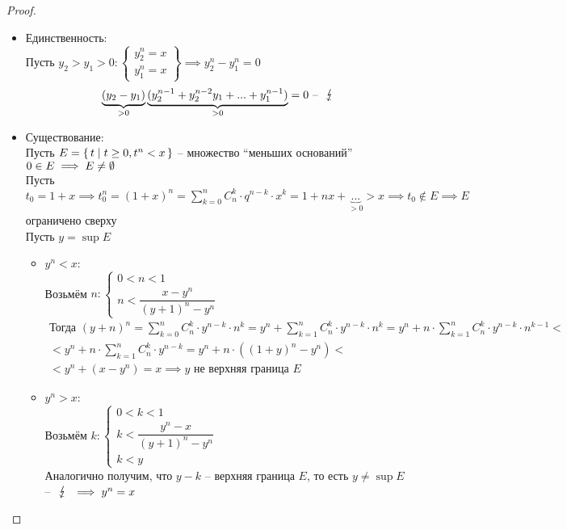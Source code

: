 \begin{proof}
	\hfill
	\begin{itemize}
		\item Единственность: \\
		Пусть $y_2 > y_1 > 0 : \begin{Bmatrix} y_2^n = x \\ y_1^n = x \end{Bmatrix} \implies y_2^n - y_1^n = 0 $
		$$ \underbrace{(y_2 - y_1)}_{>0} \underbrace{(y_2^{n-1} + y_2^{n-2}y_1 + ... + y_1^{n-1})}_{>0} = 0 \text{ -- } \contra $$
		\item Существование: \\
		Пусть $E = \set{t | t \ge 0, t^n < x}$ -- множество ``меньших оснований'' \\
		$0 \in E \implies E \ne \emptyset $ \\
		Пусть $t_0 = 1 + x \implies t_0^n = (1+x)^n = \sum_{k=0}^n C_n^k \cdot q^{n-k} \cdot x^k = 1 + nx + \underbrace{...}_{>0} > x \implies t_0 \notin E \implies E $ ограничено сверху \\
		Пусть $y = \sup E$
		\begin{itemize}
			\item $y^n < x$: \\
			Возьмём $n : \begin{cases} 0 < n < 1 \\ n < \dfrac{x - y^n}{(y+1)^n - y^n} \end{cases} $
			\begin{multline*}
				\text{Тогда } (y + n)^n = \sum_{k=0}^n C_n^k \cdot y^{n-k} \cdot n^k = y^n + \sum_{k=1}^n C_n^k \cdot y^{n-k} \cdot n^k = y^n + n \cdot \sum_{k=1}^n C_n^k \cdot y^{n-k} \cdot n^{k-1} < \\ < y^n + n \cdot \sum_{k=1}^n C_n^k \cdot y^{n-k} = y^n + n \cdot ((1 + y)^n - y^n) < \\ < y^n + (x - y^n) = x \implies y \text{ не верхняя граница } E
			\end{multline*}
			\item $y^n > x$: \\
			Возьмём $k : \begin{cases} 0 < k < 1 \\ k < \dfrac{y^n - x}{(y + 1)^n - y^n} \\ k < y \end{cases} $ \\
			Аналогично получим, что $y - k$ -- верхняя граница $E$, то есть $y \ne \sup E$ -- $\contra \implies y^n = x$
		\end{itemize}
	\end{itemize}
\end{proof}


